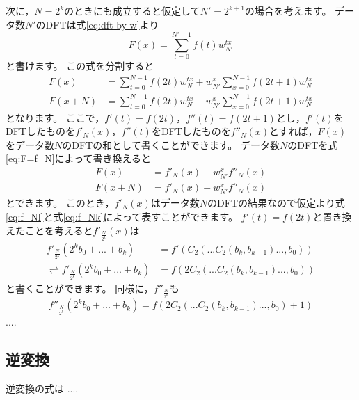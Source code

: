 \documentclass[uplatex, 11pt, a4j, dvipdfmx]{jsarticle}
\begin{document}
    次に，$N=2^k$のときにも成立すると仮定して$N'=2^{k+1}$の場合を考えます。
    データ数$N'$のDFTは式\eqref{eq:dft-by-w}より
    \begin{equation}
        F(x) = \sum_{t=0}^{N'-1} f(t) w^{tx}_{N'}
    \end{equation}
    と書けます。
    この式を分割すると
    \begin{align}
        F(x)     &= \sum_{t=0}^{N-1} { f(2t) w^{tx}_{N} } +  w^{x}_{N'} \sum_{x=0}^{N-1} { f(2t + 1) w^{tx}_{N} } \\
        F(x + N) &= \sum_{t=0}^{N-1} { f(2t) w^{tx}_{N} } -  w^{x}_{N'} \sum_{x=0}^{N-1} { f(2t + 1) w^{tx}_{N} }
    \end{align}
    となります。
    ここで，$f'(t) = f(2t)$，$f''(t) = f(2t + 1)$とし，$f'(t)$をDFTしたものを$f'_N(x)$，$f''(t)$をDFTしたものを$f''_N(x)$とすれば，$F(x)$をデータ数$N$のDFTの和として書くことができます。
    データ数$N$のDFTを式\eqref{eq:F=f_N}によって書き換えると
    \begin{align}
        F(x)     &= f'_N(x) +  w^{x}_{N'} f''_N(x) \\
        F(x + N) &= f'_N(x) -  w^{x}_{N'} f''_N(x)
    \end{align}
    とできます。
    このとき，$f'_N(x)$はデータ数$N$のDFTの結果なので仮定より式\eqref{eq:f_Nl}と式\eqref{eq:f_Nk}によって表すことができます。
    $f'(t) = f(2t)$と置き換えたことを考えると$f'_{\frac{N}{2^k}}(x)$は
    \begin{align}
        f'_{\frac{N}{2^k}}(2^kb_0 + ... + b_k) &= f'(C_2(...C_2(b_k, b_{k-1})..., b_0)) \\
        \rightleftharpoons
        f'_{\frac{N}{2^k}}(2^kb_0 + ... + b_k) &= f(2 C_2(...C_2(b_k, b_{k-1})..., b_0))
    \end{align}
    と書くことができます。
    同様に，$f''_{\frac{N}{2^k}}$も
    \begin{equation}
        f''_{\frac{N}{2^k}}(2^kb_0 + ... + b_k) = f(2 C_2(...C_2(b_k, b_{k-1})..., b_0) + 1)
    \end{equation}
    ....


    \subsection{逆変換}
    逆変換の式は
    ....
\end{document}

